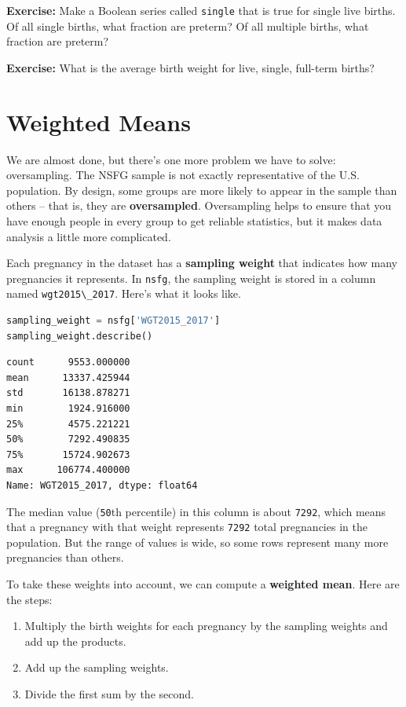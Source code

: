 \textbf{Exercise:} Make a Boolean series called
\passthrough{\lstinline!single!} that is true for single live births. Of
all single births, what fraction are preterm? Of all multiple births,
what fraction are preterm?

\textbf{Exercise:} What is the average birth weight for live, single,
full-term births?

\section{Weighted Means}\label{weighted-means}

We are almost done, but there's one more problem we have to solve:
oversampling. The NSFG sample is not exactly representative of the U.S.
population. By design, some groups are more likely to appear in the
sample than others -- that is, they are \textbf{oversampled}.
Oversampling helps to ensure that you have enough people in every group
to get reliable statistics, but it makes data analysis a little more
complicated.

Each pregnancy in the dataset has a \textbf{sampling weight} that
indicates how many pregnancies it represents. In
\passthrough{\lstinline!nsfg!}, the sampling weight is stored in a
column named \passthrough{\lstinline!wgt2015\_2017!}. Here's what it
looks like.

\begin{lstlisting}[language=Python,style=source]
sampling_weight = nsfg['WGT2015_2017']
sampling_weight.describe()
\end{lstlisting}

\begin{lstlisting}[style=output]
count      9553.000000
mean      13337.425944
std       16138.878271
min        1924.916000
25%        4575.221221
50%        7292.490835
75%       15724.902673
max      106774.400000
Name: WGT2015_2017, dtype: float64
\end{lstlisting}

The median value (\passthrough{\lstinline!50!}th percentile) in this
column is about \passthrough{\lstinline!7292!}, which means that a
pregnancy with that weight represents \passthrough{\lstinline!7292!}
total pregnancies in the population. But the range of values is wide, so
some rows represent many more pregnancies than others.

To take these weights into account, we can compute a \textbf{weighted
mean}. Here are the steps:

\begin{enumerate}
\def\labelenumi{\arabic{enumi}.}
\item
  Multiply the birth weights for each pregnancy by the sampling weights
  and add up the products.
\item
  Add up the sampling weights.
\item
  Divide the first sum by the second.
\end{enumerate}

